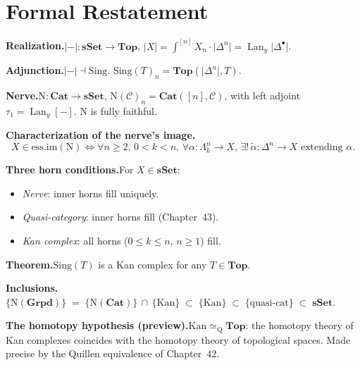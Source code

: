 \section*{Formal Restatement}

\begin{formalrestatement}
\textbf{Realization.}\quad $\lvert{-}\rvert : \mathbf{sSet} \to \mathbf{Top}$,
$\lvert X\rvert = \int^{[n]} X_n \cdot \lvert\Delta^n\rvert
= \operatorname{Lan}_y \lvert\Delta^\bullet\rvert$.

\medskip
\textbf{Adjunction.}\quad $\lvert{-}\rvert \dashv \mathrm{Sing}$.
$\mathrm{Sing}(T)_n = \mathbf{Top}(\lvert\Delta^n\rvert, T)$.

\medskip
\textbf{Nerve.}\quad $\mathrm{N} : \mathbf{Cat} \to \mathbf{sSet}$,
$\mathrm{N}(\mathcal{C})_n = \mathbf{Cat}([n], \mathcal{C})$, with left
adjoint $\tau_1 = \operatorname{Lan}_y [-]$. $\mathrm{N}$ is fully faithful.

\medskip
\textbf{Characterization of the nerve's image.}\quad
\begin{equation*}
  X \in \mathrm{ess.im}(\mathrm{N}) \iff \forall n \geq 2, \, 0 < k < n, \,
  \forall \alpha : \Lambda^n_k \to X, \, \exists ! \, \tilde\alpha : \Delta^n \to X
  \text{ extending } \alpha.
\end{equation*}

\medskip
\textbf{Three horn conditions.}\quad For $X \in \mathbf{sSet}$:
\begin{itemize}
  \item \emph{Nerve}: inner horns fill uniquely.
  \item \emph{Quasi-category}: inner horns fill (Chapter~43).
  \item \emph{Kan complex}: all horns ($0 \leq k \leq n$, $n \geq 1$) fill.
\end{itemize}

\medskip
\textbf{Theorem.}\quad $\mathrm{Sing}(T)$ is a Kan complex for any $T \in
\mathbf{Top}$.

\medskip
\textbf{Inclusions.}\quad
$\{\mathrm{N}(\mathbf{Grpd})\} \;=\;
\{\mathrm{N}(\mathbf{Cat})\} \,\cap\, \{\mathrm{Kan}\} \;\subset\;
\{\mathrm{Kan}\} \;\subset\; \{\mathrm{quasi}\text{-}\mathrm{cat}\} \;\subset\; \mathbf{sSet}$.

\medskip
\textbf{The homotopy hypothesis (preview).}\quad $\mathrm{Kan} \simeq_{\mathrm{Q}}
\mathbf{Top}$: the homotopy theory of Kan complexes coincides with the
homotopy theory of topological spaces. Made precise by the Quillen
equivalence of Chapter~42.
\end{formalrestatement}

